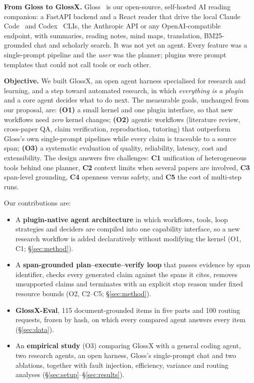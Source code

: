 \documentclass{article}
\newcommand{\sysname}{GlossX}
\newcommand{\gloss}{Gloss}
\begin{document}
\textbf{From \gloss{} to \sysname{}.} \gloss{}~\cite{gloss2026} is our open-source, self-hosted AI reading companion: a FastAPI backend and a React reader that drive the local Claude Code~\cite{claudecode} and Codex~\cite{codex} CLIs, the Anthropic API or any OpenAI-compatible endpoint, with summaries, reading notes, mind maps, translation, BM25-grounded chat and scholarly search. It was not yet an agent. Every feature was a single-prompt pipeline and the \emph{user} was the planner; plugins were prompt templates that could not call tools or each other.

\textbf{Objective.} We built \sysname{}, an open agent harness specialised for research and learning, and a step toward automated research, in which \emph{everything is a plugin} and a core agent decides what to do next. The measurable goals, unchanged from our proposal, are:
\textbf{(O1)} a small kernel and one plugin interface, so that new workflows need \emph{zero} kernel changes;
\textbf{(O2)} agentic workflows (literature review, cross-paper QA, claim verification, reproduction, tutoring) that outperform \gloss{}'s own single-prompt pipelines while every claim is traceable to a source span;
\textbf{(O3)} a systematic evaluation of quality, reliability, latency, cost and extensibility.
The design answers five challenges: \textbf{C1} unification of heterogeneous tools behind one planner, \textbf{C2} context limits when several papers are involved, \textbf{C3} span-level grounding, \textbf{C4} openness versus safety, and \textbf{C5} the cost of multi-step runs.

Our contributions are:
\begin{itemize}
  \item A \textbf{plugin-native agent architecture} in which workflows, tools, loop strategies and deciders are compiled into one capability interface, so a new research workflow is added declaratively without modifying the kernel (O1, C1; \S\ref{sec:method}).
  \item A \textbf{span-grounded plan--execute--verify loop} that passes evidence by span identifier, checks every generated claim against the spans it cites, removes unsupported claims and terminates with an explicit stop reason under fixed resource bounds (O2, C2--C5; \S\ref{sec:method}).
  \item \textbf{\sysname{}-Eval}, 115 document-grounded items in five parts and 100 routing requests, frozen by hash, on which every compared agent answers every item (\S\ref{sec:data}).
  \item An \textbf{empirical study} (O3) comparing \sysname{} with a general coding agent, two research agents, an open harness, \gloss{}'s single-prompt chat and two ablations, together with fault injection, efficiency, variance and routing analyses (\S\ref{sec:setup}--\S\ref{sec:results}).
\end{itemize}
\end{document}
